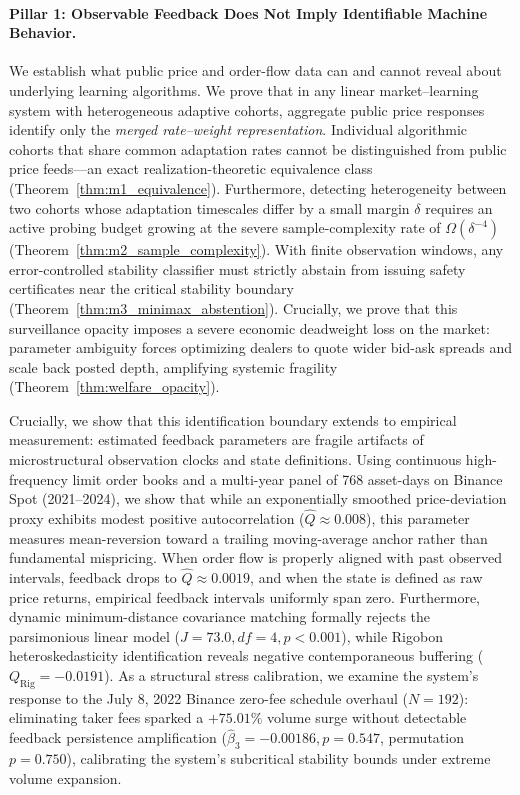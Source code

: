 \documentclass[12pt]{article}
\theoremstyle{definition}
\theoremstyle{remark}
\begin{document}
\paragraph{Pillar 1: Observable Feedback Does Not Imply Identifiable Machine Behavior.}
We establish what public price and order-flow data can and cannot reveal about underlying learning algorithms. We prove that in any linear market--learning system with heterogeneous adaptive cohorts, aggregate public price responses identify only the \emph{merged rate--weight representation}. Individual algorithmic cohorts that share common adaptation rates cannot be distinguished from public price feeds—an exact realization-theoretic equivalence class (Theorem~\ref{thm:m1_equivalence}). Furthermore, detecting heterogeneity between two cohorts whose adaptation timescales differ by a small margin $\delta$ requires an active probing budget growing at the severe sample-complexity rate of $\Omega(\delta^{-4})$ (Theorem~\ref{thm:m2_sample_complexity}). With finite observation windows, any error-controlled stability classifier must strictly abstain from issuing safety certificates near the critical stability boundary (Theorem~\ref{thm:m3_minimax_abstention}). Crucially, we prove that this surveillance opacity imposes a severe economic deadweight loss on the market: parameter ambiguity forces optimizing dealers to quote wider bid-ask spreads and scale back posted depth, amplifying systemic fragility (Theorem~\ref{thm:welfare_opacity}).

Crucially, we show that this identification boundary extends to empirical measurement: estimated feedback parameters are fragile artifacts of microstructural observation clocks and state definitions. Using continuous high-frequency limit order books and a multi-year panel of 768 asset-days on Binance Spot (2021--2024), we show that while an exponentially smoothed price-deviation proxy exhibits modest positive autocorrelation ($\hat{Q} \approx 0.008$), this parameter measures mean-reversion toward a trailing moving-average anchor rather than fundamental mispricing. When order flow is properly aligned with past observed intervals, feedback drops to $\hat{Q} \approx 0.0019$, and when the state is defined as raw price returns, empirical feedback intervals uniformly span zero. Furthermore, dynamic minimum-distance covariance matching formally rejects the parsimonious linear model ($J = 73.0, df = 4, p < 0.001$), while Rigobon heteroskedasticity identification reveals negative contemporaneous buffering ($Q_{\text{Rig}} = -0.0191$). As a structural stress calibration, we examine the system's response to the July 8, 2022 Binance zero-fee schedule overhaul ($N=192$): eliminating taker fees sparked a $+75.01\%$ volume surge without detectable feedback persistence amplification ($\hat{\beta}_3 = -0.00186, p = 0.547$, permutation $p = 0.750$), calibrating the system's subcritical stability bounds under extreme volume expansion.
\end{document}
